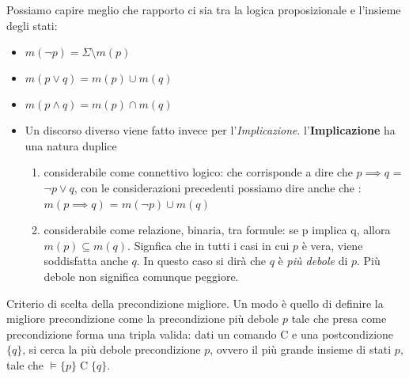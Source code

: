 Possiamo capire meglio che rapporto ci sia tra la logica proposizionale e l'insieme degli stati:
\begin{itemize}
    \item $m(\neg p) = \Sigma \setminus m(p)$
    \item $m(p \lor q) = m(p) \cup m(q)$
    \item $m(p \land q) = m(p) \cap m(q)$
    \item Un discorso diverso viene fatto invece per l'\textit{Implicazione}. l'\textbf{Implicazione} ha una natura duplice 
        \begin{enumerate}
            \item considerabile come connettivo logico: che corrisponde a dire che  $p \implies q$ = $\neg p \lor q$, con le considerazioni precedenti possiamo dire anche che :  $m(p \implies q)$ = $m(\neg p)  \cup m(q)$
            \item considerabile come relazione, binaria, tra formule: se p implica q, allora $m(p) \subseteq m(q)$. Signfica che in tutti i casi in cui $p$ è vera, viene soddisfatta anche $q$. In questo caso si dirà che $q$ è \textit{più debole} di $p$. Più debole non significa comunque peggiore.
        \end{enumerate}
\end{itemize}

Criterio di scelta della precondizione migliore. Un modo è quello di definire la migliore precondizione come la precondizione più debole $p$ tale che presa come precondizione forma una tripla valida: dati un comando $\text{C}$ e una postcondizione $\{q\}$, si cerca la più debole precondizione $p$, ovvero il più grande insieme di stati $p$, tale che $\models \{p\} \; \text{C} \; \{q\}$.

